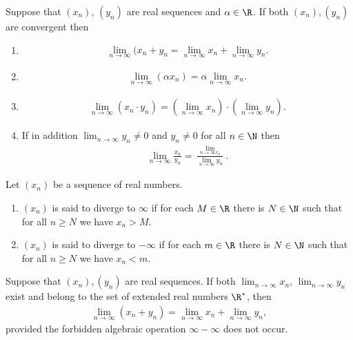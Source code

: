 \documentclass{article}
\begin{document}
\begin{theorem}
    Suppose that $(x_n)$, $(y_n)$ are real sequences and $\alpha\in\R$. If both $(x_n), (y_n)$ are
    convergent then
    \begin{enumerate}
        \item \begin{align*}
                  \lim_{n\to\infty}(x_n+y_n=\lim_{n\to\infty}x_n + \lim_{n\to\infty}y_n.
              \end{align*}
        \item \begin{align*}
                  \lim_{n\to\infty}(\alpha x_n) = \alpha\lim_{n\to\infty}x_n.
              \end{align*}
        \item \begin{align*}
                  \lim_{n\to\infty}(x_n\cdot y_n) = \left(\lim_{n\to\infty}x_n\right)\cdot\left(\lim_{n\to\infty}y_n\right).
              \end{align*}
        \item If in addition $\lim_{n\to\infty}y_n\not=0$ and $y_n\not=0$ for all $n\in\N$ then \begin{align*}
                  \lim_{n\to\infty}\frac{x_n}{y_n}=\frac{\lim_{n\to\infty x_n}}{\lim_{n\to\infty}y_n}.
              \end{align*}
    \end{enumerate}
\end{theorem}

\setcounter{theorem}{5}
\begin{definition}
    Let $(x_n)$ be a sequence of real numbers.
    \begin{enumerate}
        \item $(x_n)$ is said to diverge to $\infty$ if for each $M\in\R$ there is $N\in\N$ such that
              for all $n\geq N$ we have $x_n>M$.
        \item $(x_n)$ is said to diverge to $-\infty$ if for each $m\in\R$ there is $N\in\N$ such that
              for all $n\geq N$ we have $x_n<m$.
    \end{enumerate}
\end{definition}

\begin{theorem}
    Suppose that $(x_n), (y_n)$ are real sequences. If both $\lim_{n\to\infty}x_n$, $\lim_{n\to\infty}y_n$
    exist and belong to the set of extended real numbers $\R^*$, then
    \begin{align*}
        \lim_{n\to\infty}(x_n+y_n)=\lim_{n\to\infty}x_n+\lim_{n\to\infty}y_n,
    \end{align*}
    provided the forbidden algebraic operation $\infty-\infty$ does not occur.
\end{theorem}
\end{document}
